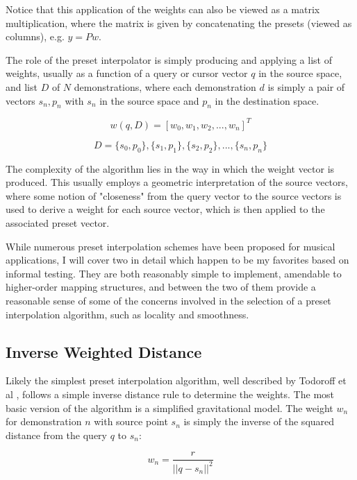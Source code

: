 \documentclass[main.tex]{subfiles}
\begin{document}
Notice that this application of the weights can also be viewed as a matrix
multiplication, where the matrix is given by concatenating the presets (viewed as columns),
e.g. $y = Pw$.

The role of the preset interpolator is simply producing and
applying a list of weights, usually as a function of a query or cursor vector
$q$ in the source space, and list $D$ of $N$ demonstrations, where each demonstration $d$
is simply a pair of vectors ${s_n, p_n}$ with $s_n$ in the source space and $p_n$ in the
destination space.

\begin{displaymath}
w(q, D) = [w_0, w_1, w_2, ..., w_{n}]^T 
\end{displaymath}

\begin{displaymath}
D = \{s_0, p_0\}, \{s_1, p_1\}, \{s_2, p_2\}, ..., \{s_n, p_n\}
\end{displaymath}

The complexity of the algorithm lies in the way in which the weight vector is produced.
This usually employs a geometric interpretation of the source vectors, where
some notion of "closeness" from the query vector to the source vectors is used
to derive a weight for each source vector, which is then applied to the associated
preset vector.

While numerous preset interpolation schemes have been proposed for musical applications,
I will cover two in detail which happen to be my favorites based on informal testing.
They are both reasonably simple to implement, amendable to higher-order mapping structures,
and between the two of them provide a reasonable sense of some of the concerns involved
in the selection of a preset interpolation algorithm, such as locality and smoothness.

\subsection{Inverse Weighted Distance}

Likely the simplest preset interpolation algorithm,
well described by Todoroff et al \cite{todoroff2009icmc_interpolation-tools},
follows a simple inverse distance rule to determine the weights.
The most basic version of the algorithm is a simplified gravitational model.
The weight $w_n$ for demonstration $n$ with source point $s_n$ is simply
the inverse of the squared distance from the query $q$ to $s_n$:

\begin{displaymath}
w_n = \frac{r}{||q - s_n||^2}
\end{displaymath}
\end{document}

